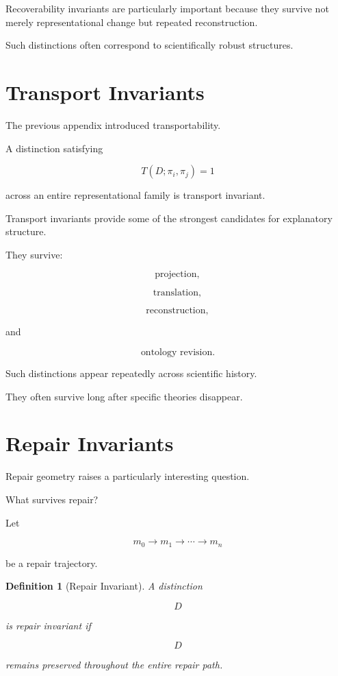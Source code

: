 \documentclass[11pt,oneside,openany]{book}
\newtheorem{definition}{Definition}[chapter] \newtheorem{theorem}{Theorem}[chapter] \newtheorem{proposition}{Proposition}[chapter] \newtheorem{lemma}{Lemma}[chapter] \newtheorem{corollary}{Corollary}[chapter] \newtheorem{remark}{Remark}[chapter]
\begin{document}
Recoverability invariants are particularly important because they survive not merely representational change but repeated reconstruction.

Such distinctions often correspond to scientifically robust structures.

\section{Transport Invariants}

The previous appendix introduced transportability.

A distinction satisfying

\[
T(D;\pi_i,\pi_j)=1
\]

across an entire representational family is transport invariant.

Transport invariants provide some of the strongest candidates for explanatory structure.

They survive:

\[
\text{projection},
\]

\[
\text{translation},
\]

\[
\text{reconstruction},
\]

and

\[
\text{ontology revision}.
\]

Such distinctions appear repeatedly across scientific history.

They often survive long after specific theories disappear.

\section{Repair Invariants}

Repair geometry raises a particularly interesting question.

What survives repair?

Let

\[
m_0
\rightarrow
m_1
\rightarrow
\cdots
\rightarrow
m_n
\]

be a repair trajectory.

\begin{definition}[Repair Invariant]

A distinction

\[
D
\]

is repair invariant if

\[
D
\]

remains preserved throughout the entire repair path.

\end{definition}
\end{document}
